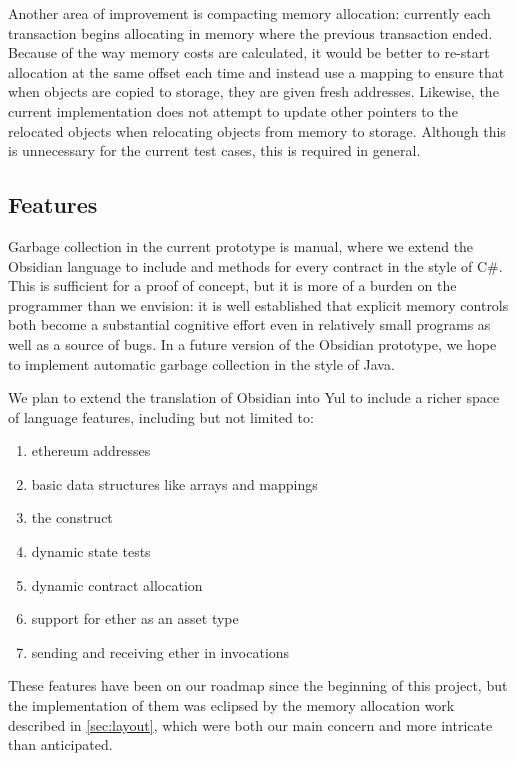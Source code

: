 Another area of improvement is compacting memory allocation: currently each transaction begins allocating in memory where the previous transaction ended. Because of the way memory costs are calculated, it would be better to re-start allocation at the same offset each time and instead use a mapping to ensure that when objects are copied to storage, they are given fresh addresses. Likewise, the current implementation does not attempt to update other pointers to the relocated objects when relocating objects from memory to storage. Although this is unnecessary for the current test cases, this is required in general.

\subsection{Features}

Garbage collection in the current prototype is manual, where we extend the
Obsidian language to include  and  methods
for every contract in the style of C\#. This is sufficient for
a proof of concept, but it is more of a burden on the programmer than we
envision: it is well established that explicit memory controls both become
a substantial cognitive effort even in relatively small programs as well as
a source of bugs.  In a future version of the Obsidian
prototype, we hope to implement automatic garbage collection in the style
of Java.

We plan to extend the translation of Obsidian into Yul to include a richer
space of language features, including but not limited to:
\begin{enumerate} %
\item ethereum addresses
\item basic data structures like arrays and mappings
\item the  construct
\item dynamic state tests
\item dynamic contract allocation
\item support for ether as an asset type
\item sending and receiving ether in invocations
\end{enumerate}
These features have been on our roadmap since the beginning of this
project, but the implementation of them was eclipsed by the memory allocation work 
described in \ref{sec:layout}, which were both our main concern and more
intricate than anticipated.

